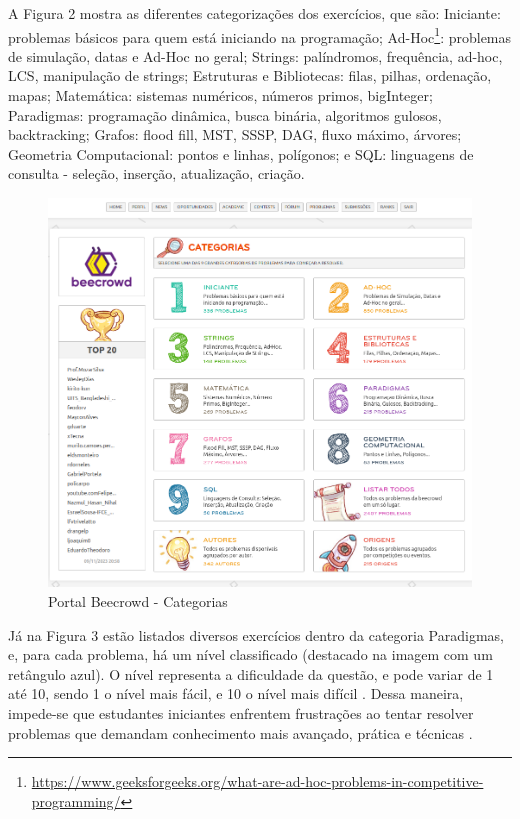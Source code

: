 A Figura 2 mostra as diferentes categorizações dos exercícios, que são: Iniciante: problemas básicos para quem está iniciando na programação; Ad-Hoc\footnote{\url{https://www.geeksforgeeks.org/what-are-ad-hoc-problems-in-competitive-programming/}}: problemas de simulação, datas e Ad-Hoc no geral; Strings: palíndromos, frequência, ad-hoc, LCS, manipulação de strings; Estruturas e Bibliotecas: filas, pilhas, ordenação, mapas; Matemática: sistemas numéricos, números primos, bigInteger; Paradigmas: programação dinâmica, busca binária, algoritmos gulosos, backtracking; Grafos: flood fill, MST, SSSP, DAG, fluxo máximo, árvores; Geometria Computacional: pontos e linhas, polígonos; e SQL: linguagens de consulta - seleção, inserção, atualização, criação.

\begin{figure}[h!]
	   \centering
            \caption{Portal Beecrowd - Categorias}
            \label{fig:ModeloConceitual}
	   	\includegraphics[scale=0.3]{pictures/beecrowd_problemas.png}
\end{figure}

Já na Figura 3 estão listados diversos exercícios dentro da categoria Paradigmas, e, para cada problema, há um nível classificado (destacado na imagem com um retângulo azul). O nível representa a dificuldade da questão, e pode variar de 1 até 10, sendo 1 o nível mais fácil, e 10 o nível mais difícil \cite{beecrowd}. Dessa maneira, impede-se que estudantes iniciantes enfrentem frustrações ao tentar resolver problemas que demandam conhecimento mais avançado, prática e técnicas \cite[p.~239]{beztonin2014}.

